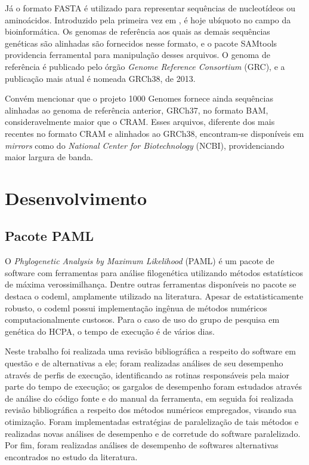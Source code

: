 \documentclass[cic,tc]{iiufrgs}
\begin{document}
Já o formato FASTA é utilizado para representar sequências
de nucleotídeos ou aminoácidos. Introduzido pela primeira vez em
\cite{fasta}, é hoje ubíquoto no campo da
bioinformática.\cite{shen2016seqkit} Os genomas de referência aos quais as
demais sequências genéticas são alinhadas são fornecidos nesse formato, e o
pacote SAMtools providencia ferramental para manipulação desses arquivos. O
genoma de referência é publicado pelo órgão \textit{Genome Reference
Consortium} (GRC), e a publicação mais atual é nomeada GRCh38, de
2013.\cite{GUO201783}

Convém mencionar que o projeto 1000 Genomes fornece ainda sequências alinhadas
ao genoma de referência anterior, GRCh37, no formato BAM, consideravelmente
maior que o CRAM. Esses arquivos, diferente dos mais recentes no formato CRAM e
alinhados ao GRCh38, encontram-se disponíveis em \textit{mirrors} como do
\textit{National Center for Biotechnology} (NCBI), providenciando maior largura
de banda.\cite{clarke20121000}


\chapter{Desenvolvimento}

\section{Pacote PAML}

O \textit{Phylogenetic Analysis by Maximum Likelihood} (PAML) é um pacote de
software com ferramentas para análise filogenética utilizando métodos
estatísticos de máxima verossimilhança.\cite{yang2007paml} Dentre
outras ferramentas disponíveis no pacote se destaca o codeml,
amplamente utilizado na literatura.\cite{maldonado2016lmap} Apesar de
estatisticamente robusto,\cite{maldonado2016lmap} o codeml possui
implementação ingênua de métodos numéricos computacionalmente
custosos.\cite{yang2020paml} Para o caso de uso do grupo de pesquisa em
genética do HCPA, o tempo de execução é de vários dias.

Neste trabalho foi realizada uma revisão bibliográfica a respeito do software
em questão e de alternativas a ele; foram realizadas análises de seu desempenho
através de perfis de execução, identificando as rotinas responsáveis pela maior
parte do tempo de execução; os gargalos de desempenho foram estudados através
de análise do código fonte e do manual da ferramenta, em seguida foi realizada
revisão bibliográfica a respeito dos métodos numéricos empregados, visando sua
otimização. Foram implementadas estratégias de paralelização de tais métodos e
realizadas novas análises de desempenho e de corretude do software
paralelizado. Por fim, foram realizadas análises de desempenho de softwares
alternativas encontrados no estudo da literatura.
\end{document}
